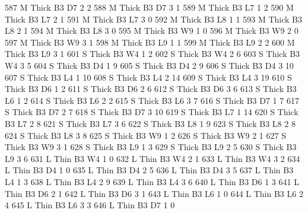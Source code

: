 \documentclass{article}
\begin{document}
\begin{Schunk}
\begin{Soutput}
587       M  Thick   B3      D7     2     2
588       M  Thick   B3      D7     3     1
589       M  Thick   B3      L7     1     2
590       M  Thick   B3      L7     2     1
591       M  Thick   B3      L7     3     0
592       M  Thick   B3      L8     1     1
593       M  Thick   B3      L8     2     1
594       M  Thick   B3      L8     3     0
595       M  Thick   B3      W9     1     0
596       M  Thick   B3      W9     2     0
597       M  Thick   B3      W9     3     1
598       M  Thick   B3      L9     1     1
599       M  Thick   B3      L9     2     2
600       M  Thick   B3      L9     3     1
601       S  Thick   B3      W4     1     2
602       S  Thick   B3      W4     2     6
603       S  Thick   B3      W4     3     5
604       S  Thick   B3      D4     1     9
605       S  Thick   B3      D4     2     9
606       S  Thick   B3      D4     3    10
607       S  Thick   B3      L4     1    10
608       S  Thick   B3      L4     2    14
609       S  Thick   B3      L4     3    19
610       S  Thick   B3      D6     1     2
611       S  Thick   B3      D6     2     6
612       S  Thick   B3      D6     3     6
613       S  Thick   B3      L6     1     2
614       S  Thick   B3      L6     2     2
615       S  Thick   B3      L6     3     7
616       S  Thick   B3      D7     1     7
617       S  Thick   B3      D7     2     7
618       S  Thick   B3      D7     3    10
619       S  Thick   B3      L7     1    14
620       S  Thick   B3      L7     2     8
621       S  Thick   B3      L7     3     6
622       S  Thick   B3      L8     1     9
623       S  Thick   B3      L8     2     8
624       S  Thick   B3      L8     3     8
625       S  Thick   B3      W9     1     2
626       S  Thick   B3      W9     2     1
627       S  Thick   B3      W9     3     1
628       S  Thick   B3      L9     1     3
629       S  Thick   B3      L9     2     5
630       S  Thick   B3      L9     3     6
631       L   Thin   B3      W4     1     0
632       L   Thin   B3      W4     2     1
633       L   Thin   B3      W4     3     2
634       L   Thin   B3      D4     1     0
635       L   Thin   B3      D4     2     5
636       L   Thin   B3      D4     3     5
637       L   Thin   B3      L4     1     3
638       L   Thin   B3      L4     2     9
639       L   Thin   B3      L4     3     6
640       L   Thin   B3      D6     1     3
641       L   Thin   B3      D6     2     1
642       L   Thin   B3      D6     3     1
643       L   Thin   B3      L6     1     0
644       L   Thin   B3      L6     2     4
645       L   Thin   B3      L6     3     3
646       L   Thin   B3      D7     1     0

\end{Soutput}
\end{Schunk}
\end{document}
